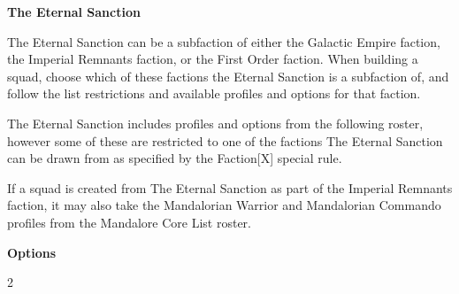 \documentclass{article}
\begin{document}
\newpage

{\Large \textbf{The Eternal Sanction}}
\vspace{0.3cm}

\begin{minipage}{19cm}
    The Eternal Sanction can be a subfaction of either the Galactic Empire faction, the
    Imperial Remnants faction, or the First Order faction. When building a squad,
    choose which of these factions the Eternal Sanction is a subfaction of, and follow
    the list restrictions and available profiles and options for that faction.
    \vspace{0.3cm}

    The Eternal Sanction includes profiles and options from the following roster, however
    some of these are restricted to one of the factions The Eternal Sanction can be drawn from
    as specified by the Faction[X] special rule.
    \vspace{0.3cm}

    If a squad is created from The Eternal Sanction as part of the Imperial Remnants faction,
    it may also take the Mandalorian Warrior and Mandalorian Commando profiles from the
    Mandalore Core List roster.
\end{minipage}

\vspace{0.3cm}
{\scriptsize
\setlength\extrarowheight{1.5pt}

}
\vspace{0.6cm}

{\large \textbf{Options}}
\vspace{0.3cm}
\begin{multicols}{2}
    {\scriptsize

    \setlength\extrarowheight{1.5pt}
    

    \vspace{0.6cm}

    \setlength\extrarowheight{1.5pt}
    

    \vspace{0.6cm}

    \setlength\extrarowheight{1.5pt}
    

    \vspace{0.6cm}

    \setlength\extrarowheight{1.5pt}
    

    \vspace{0.6cm}

    \setlength\extrarowheight{1.5pt}
    
    }
\end{multicols}
\end{document}
